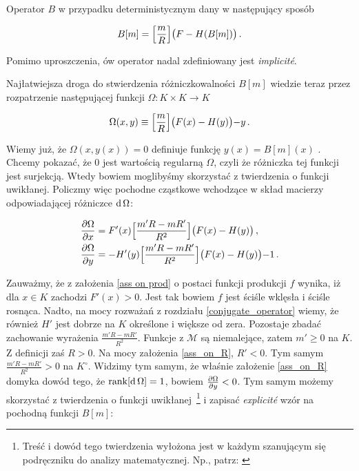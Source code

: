 	Operator $B$ w przypadku deterministycznym dany w następujący sposób

\begin{equation*}
	B[m] =   \Bigl [ \frac{m}{R}	\Bigl ] \bigl (F-H(B[m]) \bigl ) \,.	
\end{equation*} 

	Pomimo uproszczenia, ów operator nadal zdefiniowany jest {\it implicit\'e}. 

	Najłatwiejsza droga do stwierdzenia różniczkowalności $B[m]$ wiedzie teraz przez rozpatrzenie następującej funkcji $\Omega: K \times K \rightarrow K$ 
	
\begin{equation*}
	\Omega(x,y) \equiv \Bigl [ \frac{m}{R}	\Bigl ] \bigl (F(x)-H(y) \bigl ) - y\,.
\end{equation*}
	
	Wiemy już, że $\Omega(x, y(x)) = 0$ definiuje funkcję $y(x) = B[m](x)$ . Chcemy pokazać, że $0$ jest wartością regularną $\Omega$, czyli że różniczka tej funkcji jest surjekcją. Wtedy bowiem moglibyśmy skorzystać z twierdzenia o funkcji uwikłanej. Policzmy więc pochodne cząstkowe wchodzące w skład macierzy odpowiadającej różniczce $\mathrm{d}\,\Omega$:
	
\begin{equation}\label{partial_diffs}
\begin{split}
 	\frac{\partial \Omega}{\partial x} &= 	F'(x)\Bigl [ \frac{m'R - m R'}{R^2}	\Bigl ] \bigl (F(x)-H(y) \bigl )\,, \\
 	\frac{\partial \Omega}{\partial y} &=  -H'(y)\Bigl [ \frac{m'R - m R'}{R^2}	\Bigl ] \bigl (F(x)-H(y) \bigl )-1 \,. \\
\end{split}
\end{equation}

	Zauważmy, że z założenia \ref{ass on prod} o postaci funkcji produkcji $f$ wynika, iż dla $x \in K$ zachodzi $F'(x) > 0$. Jest tak bowiem $f$ jest ściśle wklęsła i ściśle rosnąca. Nadto, na mocy rozważań z rozdziału \ref{conjugate_operator} wiemy, że również $H'$ jest dobrze na $K$ określone i większe od zera. Pozostaje zbadać zachowanie wyrażenia $\frac{m'R - m R'}{R^2}$. Funkcje z $\mathcal{M}$ są niemalejące, zatem $m' \geq 0$ na $K$. Z definicji zaś $R>0$. Na mocy założenia \ref{ass_on_R}, $R'<0$. Tym samym $\frac{m'R - m R'}{R^2} > 0$ na $K^{\circ}$. Widzimy tym samym, że właśnie założenie \ref{ass_on_R} domyka dowód tego, że $\mathrm{rank}[\mathrm{d}\,\Omega] = 1$, bowiem $\frac{\partial \Omega}{\partial y} < 0$. Tym samym możemy skorzystać z twierdzenia o funkcji uwikłanej~\footnote{Treść i dowód tego twierdzenia wyłożona jest w każdym szanującym się podręczniku do analizy matematycznej. Np., patrz: \citet[][str. 40]{Spivak}} i zapisać {\it explicit\'e} wzór na pochodną funkcji $B[m]$:
	
